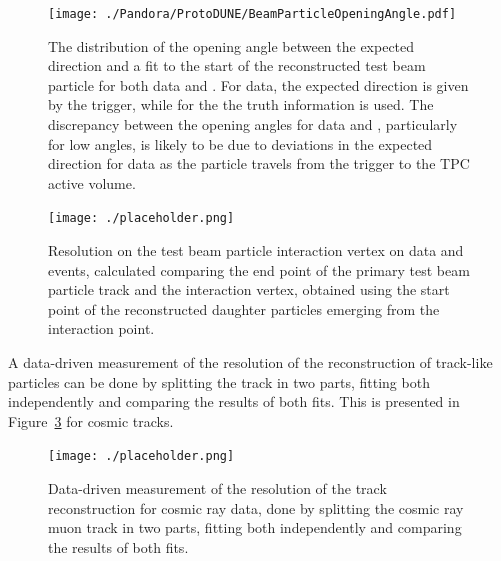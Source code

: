 \begin{figure}[!ht]
\centering
\texttt{[image: ./Pandora/ProtoDUNE/BeamParticleOpeningAngle.pdf]}
\caption[distribution of opening angle between expected direction and fit to reconstructed test beam particle, data and ]{The distribution of the opening angle between the expected direction and a fit to the start of the reconstructed test beam particle for both data and .  For data, the expected direction is given by the trigger, while for the  the truth information is used.  The discrepancy between the opening angles for data and , particularly for low angles, is likely to be due to deviations in the expected direction for data as the particle travels from the trigger to the TPC active volume.}
\label{fig:pandora_protodune_openingangle}
\end{figure}



\begin{figure}[!ht]
\centering
\texttt{[image: ./placeholder.png]}
\caption{Resolution on the test beam particle interaction vertex on  data and  events, calculated comparing the end point of the primary test beam particle track and the interaction vertex, obtained using the start point of the reconstructed daughter particles emerging from the interaction point.}
\label{fig:pandora_protodune_vertex}
\end{figure}

 A data-driven measurement of the resolution of the reconstruction of track-like particles can be done by splitting the track in two parts, fitting both independently and comparing the results of both fits. This is presented in Figure~\ref{fig:pandora_protodune_trackres} for  cosmic tracks.
 
\begin{figure}[!ht]
\centering
\texttt{[image: ./placeholder.png]}
\caption[Data-driven resolution measurement of the track reconstruction for  cosmic ray data]{Data-driven measurement of the resolution of the track reconstruction for  cosmic ray data, done by splitting the cosmic ray muon track in two parts, fitting both independently and comparing the results of both fits.}
\label{fig:pandora_protodune_trackres}
\end{figure}

